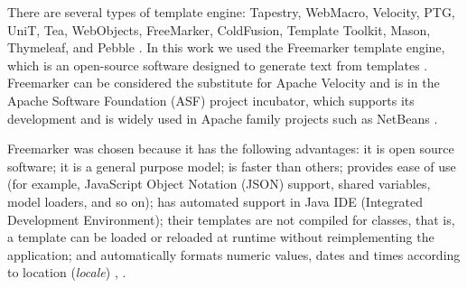 
There are several types of template engine: Tapestry, WebMacro, Velocity, PTG, UniT, Tea, WebObjects, FreeMarker, ColdFusion, Template Toolkit, Mason, Thymeleaf, and Pebble \cite{parr2004}. In this work we used the Freemarker template engine, which is an open-source software designed to generate text from templates \cite{radjenovic2009}. Freemarker can be considered the substitute for Apache Velocity and is in the Apache Software Foundation (ASF) project incubator, which supports its development and is widely used in Apache family projects such as NetBeans \cite{wengner2016}. 


Freemarker was chosen because it has the following advantages: it is open source software; it is a general purpose model; is faster than others; provides ease of use (for example, JavaScript Object Notation (JSON) support, shared variables, model loaders, and so on); has automated support in Java IDE (Integrated Development Environment); their templates are not compiled for classes, that is, a template can be loaded or reloaded at runtime without reimplementing the application; and automatically formats numeric values, dates and times according to location (\textit{locale}) \cite{benato2017}, \cite{parr2006}.

